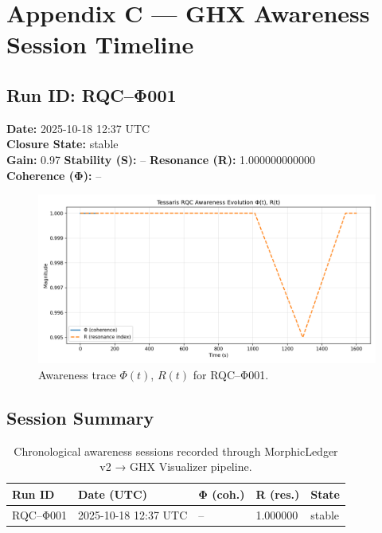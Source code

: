 \section*{Appendix C — GHX Awareness Session Timeline}

\subsection*{Run ID: RQC–Φ001}
\textbf{Date:} 2025-10-18 12:37 UTC\\
\textbf{Closure State:} stable\\
\textbf{Gain:} 0.97 \quad
\textbf{Stability (S):} -- \quad
\textbf{Resonance (R):} 1.000000000000 \\
\textbf{Coherence (Φ):} --\\

\begin{figure}[H]
\centering
\includegraphics[width=0.95\linewidth]{data/visualizations/awareness_sessions/awareness_20251018_123845.png}
\caption{Awareness trace $\Phi(t)$, $R(t)$ for RQC–Φ001.}
\end{figure}
\subsection*{Session Summary}
\begin{table}[H]
\centering
\begin{tabular}{lllll}
\toprule
Run ID & Date (UTC) & Φ (coh.) & R (res.) & State \\
\midrule
RQC–Φ001 & 2025-10-18 12:37 UTC & -- & 1.000000 & stable \\
\bottomrule
\end{tabular}
\caption{Chronological awareness sessions recorded through MorphicLedger v2 → GHX Visualizer pipeline.}
\end{table}

